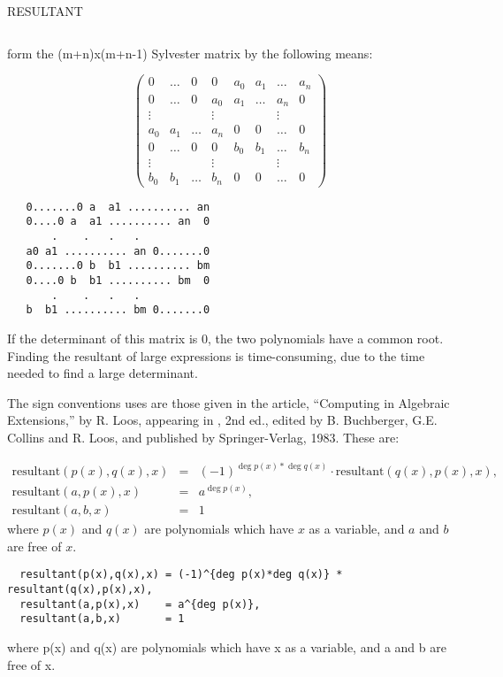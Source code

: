 \begin{Operator}[resultant]{RESULTANT}
\begin{Comments}
\begin{INFO}
{\begin{verbatim}
\end{verbatim}}
\end{INFO}
form the  (m+n)x(m+n-1) Sylvester matrix by the following means:
\begin{TEX}
\begin{displaymath}
  \left(\begin{array}{cccccccc}
           0&\ldots&0&0&a_0&a_1&\ldots&a_n\\
	   0&\ldots&0&a_0&a_1&\ldots&a_n&0\\
	   \vdots&&&\vdots&&&\vdots\\
	   a_0&a_1&\ldots&a_n&0&0&\ldots&0\\
	   0&\ldots&0&0&b_0&b_1&\ldots&b_n\\
	   \vdots&&&\vdots&&&\vdots\\
	   b_0&b_1&\ldots&b_n&0&0&\ldots&0
         \end{array}\right)
\end{displaymath}
\end{TEX}
\begin{INFO}
{\begin{verbatim}
   0.......0 a  a1 .......... an
   0....0 a  a1 .......... an  0
       .    .   .   .  
   a0 a1 .......... an 0.......0
   0.......0 b  b1 .......... bm
   0....0 b  b1 .......... bm  0
       .    .   .   .  
   b  b1 .......... bm 0.......0  

\end{verbatim}}
\end{INFO}

If the determinant of this matrix is 0, the two polynomials have a common
root.  Finding the resultant of large expressions is time-consuming, due
to the time needed to find a large determinant.

The sign conventions  uses are those given in the article,
``Computing in Algebraic Extensions,'' by R.  Loos, appearing in
, 2nd ed.,
edited by B.  Buchberger, G.E.  Collins and R.  Loos, and published by
Springer-Verlag, 1983.
These are:
\begin{TEX}
\begin{eqnarray*}
  \mbox{resultant}(p(x),q(x),x)
	&=& (-1)^{\deg p(x)*\deg q(x)}\cdot\mbox{resultant}(q(x),p(x),x),\\
  \mbox{resultant}(a,p(x),x) &=& a^{\deg p(x)},\\
  \mbox{resultant}(a,b,x) &=& 1
\end{eqnarray*}
where $p(x)$ and $q(x)$ are polynomials which have $x$ as a variable, and
$a$ and $b$ are free of $x$.
\end{TEX}
\begin{INFO}
{
\begin{verbatim}
  resultant(p(x),q(x),x) = (-1)^{deg p(x)*deg q(x)} * resultant(q(x),p(x),x),
  resultant(a,p(x),x)    = a^{deg p(x)},
  resultant(a,b,x)       = 1
\end{verbatim}
where p(x) and q(x) are polynomials which have x as a variable, and
a and b are free of x.
}
\end{INFO}


\end{Comments}
\end{Operator}
